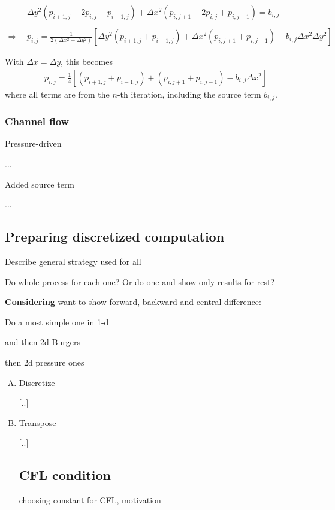 \documentclass[11pt]{article}
\begin{document}
{\begin{align}
&\Delta y^2 (p_{i+1,j} - 2p_{i,j} + p_{i-1,j}) + \Delta x^2 (p_{i,j+1} - 2p_{i,j} + p_{i,j-1})
 = b_{i,j}
	\nonumber \\ \nonumber \\
\Rightarrow ~~&
p_{i,j} = \frac{1}{2(\Delta x^2 + \Delta y^2)}
		 \left[ \Delta y^2(p_{i+1,j} + p_{i-1,j}) + \Delta x^2(p_{i,j+1} + p_{i,j-1})
		 - b_{i,j} \Delta x^2 \Delta y^2 \right]
\end{align}

With $\Delta x = \Delta y$, this becomes
\begin{align}
p_{i,j} = \frac{1}{4}
		 \left[ (p_{i+1,j} + p_{i-1,j}) + (p_{i,j+1} + p_{i,j-1})
		 - b_{i,j} \Delta x^2 \right]
\label{transpoisson}
\end{align}
where all terms are from the $n$-th iteration, including the source term $b_{i,j}$.

\subsubsection{Channel flow}
Pressure-driven

...

Added source term

...


\subsection{Preparing discretized computation}

Describe general strategy used for all

Do whole process for each one? Or do one and show only results for rest?

\textbf{Considering} want to show forward, backward and central difference:

Do a most simple one in 1-d

and then 2d Burgers

then 2d pressure ones

\begin{enumerate}[(A)]
\item Discretize

[..]

\item Transpose

[..]

\subsection{CFL condition}
choosing constant for CFL, motivation


\end{enumerate}}
\end{document}
